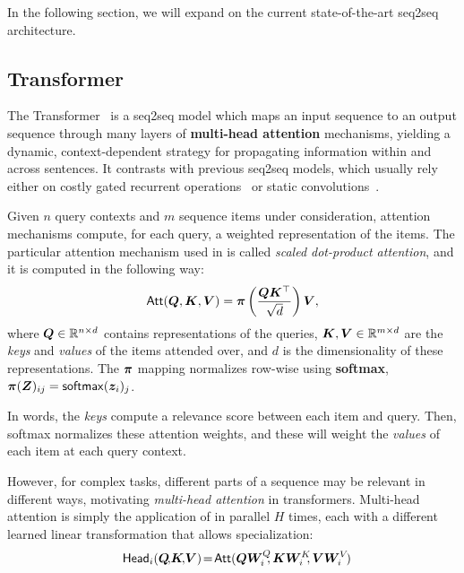 In the following section, we will expand on the current
state-of-the-art seq2seq architecture.

\subsection{Transformer}

The Transformer~\citep{vaswani2017attention} is a seq2seq model which
maps an input sequence to an output sequence through many layers of
\textbf{multi-head attention} mechanisms, yielding a dynamic,
context-dependent strategy for propagating information within and
across sentences. It contrasts with previous seq2seq models, which
usually rely either on costly gated recurrent operations~\citep[often
    LSTMs:][]{bahdanau2014neural,luong2015effective} or static
convolutions~\citep{convseq}.

Given $n$ query contexts and $m$ sequence items under consideration,
attention mechanisms compute, for each query, a weighted
representation of the items. The particular attention mechanism used
in \citet{vaswani2017attention} is called \emph{scaled dot-product
    attention}, and it is computed in the following way:
%
\begin{equation}
    \operatorname{\mathsf{Att}}(\bm{Q}, \bm{K}, \bm{V}) = \bm{\pi}
    \left(\frac{\bm{Q}\bm{K}^\top}{\sqrt{d}}\right) \bm{V},
    \label{eq:att_scaled_dot}
\end{equation}
%
where $\bm{Q} \in \mathbb{R}^{n \times d}$ contains
representations of the queries, $\bm{K}, \bm{V} \in \mathbb{R}^{m \times
        d}$ are the \emph{keys} and \emph{values} of the items attended over,
and $d$ is the dimensionality of these representations. The $\bm{\pi}$
mapping normalizes row-wise using \textbf{softmax},
$\bm{\pi}(\bm{Z})_{ij} = \operatorname*{\mathsf{softmax}}(\bm{z}_i)_j$.

In words, the \emph{keys} compute a relevance score between each item
and query. Then, softmax normalizes these attention weights, and
these will weight the \emph{values} of each item at each query
context.

However, for complex tasks, different parts of a sequence may be
relevant in different ways, motivating \emph{multi-head attention} in
transformers. Multi-head attention is simply the application of
 in parallel $H$ times, each with a
different learned linear transformation that allows specialization:
%
\begin{equation}\label{eq:head}%
    \hspace{-.01ex}%
    \ath_i(\bm{Q}\!,\!\bm{K}\!,\!\bm{V})\!=\!\att(\bm{QW}_i^Q\!\!,\bm{KW}_i^K\!\!,\bm{VW}_i^V\!)%
    \hspace{-1.5ex}%
\end{equation}

